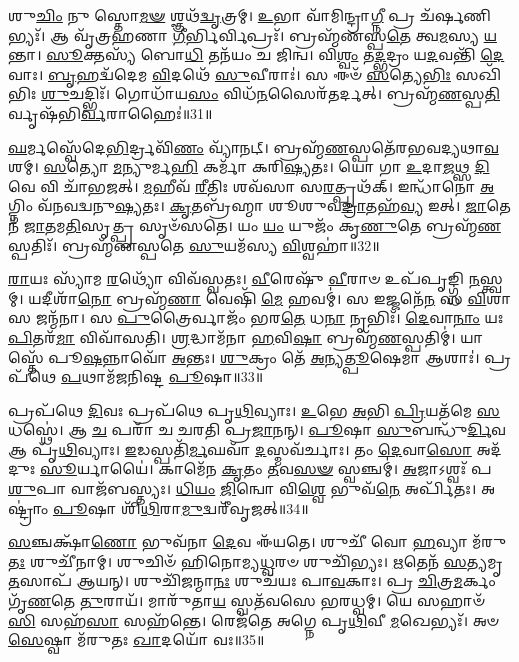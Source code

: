 𑌶𑍁\-\ul{𑌚𑌿𑌂} 𑌨𑍁 𑌸𑍍𑌤𑍋\-\ul{𑌮}\-\-\ul{𑍟} 𑌶𑍍𑌞𑌥᳴\-\ul{𑌦𑍍𑌵𑍃}\-𑌤𑍍𑌰𑌮𑍍।
\-\ul{𑌉}\-𑌭𑌾 𑌵𑌾᳴𑌮𑌿𑌨𑍍𑌦𑍍𑌰𑌾\-\ul{𑌗𑍍𑌨𑍀} 𑌪𑍍𑌰 𑌚᳴𑌰𑍍\mbox{}\-\ul{𑌷}\-𑌣𑌿𑌭𑍍𑌯𑌃᳴।
𑌆 𑌵𑍃᳴𑌤𑍍𑌰𑌹𑌣𑌾 \ul{𑌗𑍀}\-𑌰𑍍𑌭𑌿𑌰𑍍𑌵𑌿𑌪𑍍𑌰𑌃᳴।
𑌬𑍍𑌰𑌹𑍍𑌮᳴𑌣𑌸𑍍𑌪\-\ul{𑌤𑍇} 𑌤𑍍𑌵\-\ul{𑌮}\-𑌸𑍍𑌯 \ul{𑌯}\-𑌨𑍍𑌤𑌾।
\-\ul{𑌸𑍂}\-𑌕𑍍𑌤𑌸𑍍𑌯᳴ 𑌬𑍋\-\ul{𑌧𑌿} 𑌤𑌨᳴𑌯𑌂 𑌚 𑌜𑌿𑌨𑍍𑌵।
𑌵𑌿\-\ul{𑌶𑍍𑌵𑌂} 𑌤\-\ul{𑌦𑍍𑌭}\-𑌦𑍍𑌰𑌂 𑌯\-\ul{𑌦}\-𑌵𑌨𑍍𑌤𑌿᳴ \ul{𑌦𑍇}\-𑌵𑌾𑌃।
\-\ul{𑌬𑍃}\-𑌹𑌦𑍍𑌵᳴𑌦𑍇𑌮 \ul{𑌵𑌿}\-𑌦𑌥𑍇᳴ \ul{𑌸𑍁}\-𑌵𑍀𑌰𑌾𑌃॑।
𑌸 𑌈𑍞᳴ \ul{𑌸}\-𑌤𑍍𑌯𑍇\-\ul{𑌭𑌿𑌃} 𑌸𑌖𑌿᳴𑌭𑌿𑌃 \ul{𑌶𑍁}\-𑌚𑌦𑍍𑌭𑌿𑌃᳴।
𑌗𑍋𑌧𑌾᳴𑌯\-\ul{𑌸𑌂} 𑌵𑌿𑌧᳴\-\ul{𑌨}\-𑌸𑍈𑌰᳴𑌤𑌰𑍍𑌦𑌤𑍍।
𑌬𑍍𑌰𑌹𑍍𑌮᳴\-\ul{𑌣}\-𑌸𑍍𑌪\-\ul{𑌤𑌿}\-𑌰𑍍𑌵𑍃𑌷᳴𑌭𑌿\-\ul{𑌰𑍍𑌵}\-𑌰𑌾𑌹𑍈𑌃॑॥31॥

\-\ul{𑌘}\-𑌰𑍍𑌮𑌸𑍍𑌵𑍇᳴𑌦𑍇\-\ul{𑌭𑌿}\-𑌰𑍍𑌦𑍍𑌰𑌵𑌿᳴\-\ul{𑌣𑌂} 𑌵𑍍𑌯𑌾᳴𑌨𑌟𑍍।
𑌬𑍍𑌰𑌹𑍍𑌮᳴\-\ul{𑌣}\-𑌸𑍍𑌪𑌤𑍇᳴𑌰𑌭𑌵𑌦𑍍𑌯𑌥𑌾\-\ul{𑌵}\-𑌶𑌮𑍍।
\-\ul{𑌸}\-𑌤𑍍𑌯𑍋 \ul{𑌮}\-𑌨𑍍𑌯𑍁𑌰𑍍𑌮\-\ul{𑌹𑌿} 𑌕𑌰𑍍𑌮𑌾᳴ 𑌕𑌰𑌿\-\ul{𑌷𑍍𑌯}\-𑌤𑌃।
𑌯𑍋 𑌗𑌾 \ul{𑌉}\-𑌦𑌾\-\ul{𑌜}\-𑌥𑍍𑌸 \ul{𑌦𑌿}\-𑌵𑍇 𑌵𑌿 𑌚𑌾᳴𑌭𑌜𑌤𑍍।
\-\ul{𑌮}\-𑌹𑍀𑌵᳴ \ul{𑌰𑍀}\-𑌤𑌿𑌃 𑌶𑌵᳴𑌸𑌾 𑌸\-\ul{𑌰}\-𑌤𑍍𑌪𑍃𑌥᳴𑌕𑍍।
𑌇𑌨𑍍𑌧𑌾᳴𑌨𑍋 \ul{𑌅}\-𑌗𑍍𑌨𑌿𑌂 𑌵᳴𑌨𑌵𑌦𑍍𑌵𑌨𑍁\-\ul{𑌷𑍍𑌯}\-𑌤𑌃।
\-\ul{𑌕𑍃}\-𑌤𑌬𑍍𑌰᳴𑌹𑍍𑌮𑌾 𑌶𑍂𑌶𑍁𑌵\-\ul{𑌦𑍍𑌰𑌾}\-𑌤𑌹᳴\-\ul{𑌵𑍍𑌯} 𑌇𑌤𑍍।
\-\ul{𑌜𑌾}\-𑌤𑍇𑌨᳴ \ul{𑌜𑌾}\-𑌤𑌮\-\ul{𑌤𑌿}\-𑌸𑍃𑌤𑍍𑌪𑍍𑌰 𑌸𑍃𑍞᳴𑌸𑌤𑍇।
𑌯𑌂 \ul{𑌯𑌂} 𑌯𑍁𑌜𑌂᳴ 𑌕𑍃\-\ul{𑌣𑍁}\-𑌤𑍇 𑌬𑍍𑌰𑌹𑍍𑌮᳴\-\ul{𑌣}\-𑌸𑍍𑌪𑌤𑌿𑌃᳴।
𑌬𑍍𑌰𑌹𑍍𑌮᳴𑌣𑌸𑍍𑌪𑌤𑍇 \ul{𑌸𑍁}\-𑌯𑌮᳴𑌸𑍍𑌯 \ul{𑌵𑌿}\-𑌶𑍍𑌵𑌹𑌾॑॥32॥

\-\ul{𑌰𑌾}\-𑌯𑌃 𑌸𑍍𑌯𑌾᳴𑌮 \ul{𑌰}\-𑌥𑍍𑌯𑍋᳴ 𑌵𑌿𑌵᳴𑌸𑍍𑌵𑌤𑌃।
\-\ul{𑌵𑍀}\-𑌰𑍇𑌷𑍁᳴ \ul{𑌵𑍀}\-𑌰𑌾𑍞 𑌉𑌪᳴𑌪𑍃𑌙𑍍𑌗𑍍𑌧𑌿 \ul{𑌨}\-𑌸𑍍𑌤𑍍𑌵𑌮𑍍।
𑌯𑌦𑍀𑌶𑌾᳴\-\ul{𑌨𑍋} 𑌬𑍍𑌰𑌹𑍍𑌮᳴\-\ul{𑌣𑌾} 𑌵𑍇𑌷𑌿᳴ \ul{𑌮𑍇} 𑌹𑌵𑌮𑍍॑।
𑌸 𑌇𑌜𑍍𑌜𑌨𑍇᳴\-\ul{𑌨} 𑌸 \ul{𑌵𑌿}\-𑌶𑌾 𑌸 𑌜𑌨𑍍𑌮᳴𑌨𑌾।
𑌸 \ul{𑌪𑍁}\-𑌤𑍍𑌰𑍈𑌰𑍍𑌵𑌾𑌜𑌂᳴ 𑌭𑌰\-\ul{𑌤𑍇} 𑌧\-\ul{𑌨𑌾} 𑌨𑍃𑌭𑌿𑌃᳴।
\-\ul{𑌦𑍇}\-𑌵𑌾\-\ul{𑌨𑌾𑌂} 𑌯𑌃 \ul{𑌪𑌿}\-𑌤𑌰᳴\-\ul{𑌮𑌾} 𑌵𑌿𑌵𑌾᳴𑌸𑌤𑌿।
\-\ul{𑌶𑍍𑌰}\-𑌦𑍍𑌧𑌾𑌮᳴𑌨𑌾 \ul{𑌹}\-𑌵𑌿\-\ul{𑌷𑌾} 𑌬𑍍𑌰𑌹𑍍𑌮᳴\-\ul{𑌣}\-𑌸𑍍𑌪𑌤𑌿𑌮𑍍॑।
𑌯𑌾𑌸𑍍𑌤𑍇᳴ 𑌪𑍂\-\ul{𑌷}\-𑌨𑍍𑌨𑌾𑌵𑍋᳴ \ul{𑌅}\-𑌨𑍍𑌤𑌃।
\-\ul{𑌶𑍁}\-𑌕𑍍𑌰𑌂 𑌤𑍇᳴ \ul{𑌅}\-𑌨𑍍𑌯\-\ul{𑌤𑍍𑌪𑍂}\-𑌷𑍇𑌮𑌾 𑌆𑌶𑌾𑌃॑।
𑌪𑍍𑌰𑌪᳴𑌥𑍇 \ul{𑌪}\-𑌥𑌾𑌮᳴𑌜𑌨𑌿𑌷𑍍𑌟 \ul{𑌪𑍂}\-𑌷𑌾॥33॥

𑌪𑍍𑌰𑌪᳴𑌥𑍇 \ul{𑌦𑌿}\-𑌵𑌃 𑌪𑍍𑌰𑌪᳴𑌥𑍇 𑌪𑍃\-\ul{𑌥𑌿}\-𑌵𑍍𑌯𑌾𑌃।
\-\ul{𑌉}\-𑌭𑍇 \ul{𑌅}\-𑌭𑌿 \ul{𑌪𑍍𑌰𑌿}\-𑌯𑌤᳴𑌮𑍇 \ul{𑌸}\-𑌧𑌸𑍍𑌥𑍇॑।
𑌆 \ul{𑌚} 𑌪𑌰𑌾᳴ 𑌚 𑌚𑌰𑌤𑌿 𑌪𑍍𑌰\-\ul{𑌜𑌾}\-𑌨𑌨𑍍।
\-\ul{𑌪𑍂}\-𑌷𑌾 \ul{𑌸𑍁}\-𑌬𑌨𑍍𑌧𑍁᳴\-\ul{𑌰𑍍𑌦𑌿}\-𑌵 𑌆 𑌪𑍃᳴\-\ul{𑌥𑌿}\-𑌵𑍍𑌯𑌾𑌃।
\-\ul{𑌇}\-𑌡𑌸𑍍𑌪𑌤𑌿᳴\-\ul{𑌰𑍍𑌮}\-𑌘𑌵𑌾᳴ \ul{𑌦}\-𑌸𑍍𑌮𑌵᳴𑌰𑍍𑌚𑌾𑌃।
𑌤𑌂 \ul{𑌦𑍇}\-𑌵𑌾\-\ul{𑌸𑍋} 𑌅𑌦᳴𑌦𑍁𑌃 \ul{𑌸𑍂}\-𑌰𑍍𑌯𑌾𑌯𑍈॑।
𑌕𑌾𑌮𑍇᳴𑌨 \ul{𑌕𑍃}\-𑌤𑌂 \ul{𑌤}\-𑌵\-\ul{𑌸}\-\-\ul{𑍟} 𑌸𑍍𑌵𑌞𑍍𑌚𑌮𑍍॑।
\-\ul{𑌅}\-𑌜𑌾𑌽𑌶𑍍𑌵𑌃᳴ 𑌪\-\ul{𑌶𑍁}\-𑌪𑌾 𑌵𑌾𑌜᳴𑌬𑌸𑍍𑌤𑍍𑌯𑌃।
\-\ul{𑌧𑌿}\-\-\ul{𑌯𑌂} \ul{𑌜𑌿}\-𑌨𑍍𑌵𑍋 𑌵𑌿\-\ul{𑌶𑍍𑌵𑍇} 𑌭𑍁𑌵᳴\-\ul{𑌨𑍇} 𑌅𑌰𑍍𑌪𑌿᳴𑌤𑌃।
𑌅𑌷𑍍𑌟𑍍𑌰𑌾𑌂॑ \ul{𑌪𑍂}\-𑌷𑌾 𑌶𑌿᳴\-\ul{𑌥𑌿}\-𑌰𑌾\-\ul{𑌮𑍁}\-𑌦𑍍𑌵𑌰𑍀᳴𑌵𑍃𑌜𑌤𑍍॥34॥

\-\ul{𑌸}\-𑌞𑍍𑌚𑌕𑍍𑌷𑌾᳴\-\ul{𑌣𑍋} 𑌭𑍁𑌵᳴𑌨𑌾 \ul{𑌦𑍇}\-𑌵 𑌈᳴𑌯𑌤𑍇।
𑌶𑍁𑌚𑍀᳴ 𑌵𑍋 \ul{𑌹}\-𑌵𑍍𑌯𑌾 𑌮᳴𑌰𑍁\-\ul{𑌤𑌃} 𑌶𑍁𑌚𑍀᳴𑌨𑌾𑌮𑍍।
𑌶𑍁𑌚𑌿𑍞᳴ 𑌹𑌿𑌨𑍋𑌮𑍍𑌯\-\ul{𑌧𑍍𑌵}\-𑌰𑍞 𑌶𑍁𑌚𑌿᳴𑌭𑍍𑌯𑌃।
\-\ul{𑌋}\-𑌤𑍇𑌨᳴ \ul{𑌸}\-𑌤𑍍𑌯𑌮𑍃\-\ul{𑌤}\-𑌸𑌾𑌪᳴ 𑌆𑌯𑌨𑍍।
𑌶𑍁𑌚𑌿᳴𑌜𑌨𑍍𑌮𑌾\-\ul{𑌨𑌃} 𑌶𑍁𑌚᳴𑌯𑌃 𑌪𑌾\-\ul{𑌵}\-𑌕𑌾𑌃।
𑌪𑍍𑌰 \ul{𑌚𑌿}\-𑌤𑍍𑌰\-\ul{𑌮}\-𑌰𑍍𑌕𑌂 𑌗𑍃᳴\-\ul{𑌣}\-𑌤𑍇 \ul{𑌤𑍁}\-𑌰𑌾𑌯᳴।
𑌮𑌾𑌰𑍁᳴𑌤𑌾\-\ul{𑌯} 𑌸𑍍𑌵𑌤᳴𑌵𑌸𑍇 𑌭𑌰𑌧𑍍𑌵𑌮𑍍।
𑌯𑍇 𑌸𑌹𑌾𑍞᳴\-\ul{𑌸𑌿} 𑌸𑌹᳴\-\ul{𑌸𑌾} 𑌸𑌹᳴𑌨𑍍𑌤𑍇।
𑌰𑍇𑌜᳴𑌤𑍇 𑌅𑌗𑍍𑌨𑍇 𑌪𑍃\-\ul{𑌥𑌿}\-𑌵𑍀 \ul{𑌮}\-𑌖𑍇𑌭𑍍𑌯𑌃᳴।
𑌅𑍞\-\ul{𑌸𑍇}\-𑌷𑍍𑌵𑌾 𑌮᳴𑌰𑍁𑌤𑌃 \ul{𑌖𑌾}\-𑌦𑌯𑍋᳴ 𑌵𑌃॥35॥


